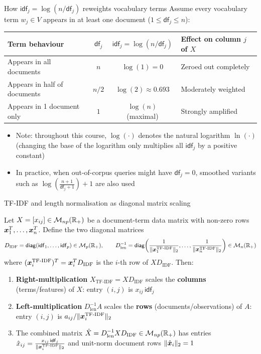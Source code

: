 \documentclass[aspectratio=169]{beamer}\usepackage[]{graphicx}\usepackage[]{xcolor}
\begin{document}
\begin{frame}{How $\mathsf{idf}_j = \log(n / \mathsf{df}_j)$ reweights vocabulary terms}
Assume every vocabulary term $w_j \in V$ appears in at least one document ($1 \le \mathsf{df}_j \le n$):
\vfill
\begin{center}
\begin{tabular}{lccl}
\toprule
\textbf{Term behaviour} & $\mathsf{df}_j$ & $\mathsf{idf}_j = \log(n/\mathsf{df}_j)$ & \textbf{Effect on column $j$ of $X$} \\
\midrule
Appears in all documents & $n$ & $\log(1) = 0$ & Zeroed out completely \\
Appears in half of documents & $n/2$ & $\log(2) \approx 0.693$ & Moderately weighted \\
Appears in 1 document only & $1$ & $\log(n)$ (maximal) & Strongly amplified \\
\bottomrule
\end{tabular}
\end{center}
\vfill
\begin{itemize}
\item Note: throughout this course, $\log(\cdot)$ denotes the natural logarithm $\ln(\cdot)$ (changing the base of the logarithm only multiplies all $\mathsf{idf}_j$ by a positive constant)
\item In practice, when out-of-corpus queries might have $\mathsf{df}_j = 0$, smoothed variants such as $\log\!\left(\frac{n+1}{\mathsf{df}_j+1}\right) + 1$ are also used
\end{itemize}
\end{frame}


\begin{frame}{TF-IDF and length normalisation as diagonal matrix scaling}
\begin{importanttheorem}\label{th:tfidf_diag_scaling}
Let $X = [x_{ij}] \in \mathcal{M}_{np}(\mathbb{R}_+)$ be a document-term data matrix with non-zero rows $\bm{x}_1^T, \ldots, \bm{x}_n^T$. Define the two diagonal matrices
\[
D_{\text{IDF}} = \mathsf{diag}(\mathsf{idf}_1, \ldots, \mathsf{idf}_p) \in \mathcal{M}_p(\mathbb{R}_+), \qquad
D_{\text{len}}^{-1} = \mathsf{diag}\!\left(\frac{1}{\|\bm{x}_1^{\text{TF-IDF}}\|_2}, \ldots, \frac{1}{\|\bm{x}_n^{\text{TF-IDF}}\|_2}\right) \in \mathcal{M}_n(\mathbb{R}_+)
\]
where $(\bm{x}_i^{\text{TF-IDF}})^T = \bm{x}_i^T D_{\text{IDF}}$ is the $i$-th row of $X D_{\text{IDF}}$. Then:
\begin{enumerate}
\item \textbf{Right-multiplication} $X_{\text{TF-IDF}} = X D_{\text{IDF}}$ scales the \textbf{columns} (terms/features) of $X$: entry $(i,j)$ is $x_{ij} \, \mathsf{idf}_j$
\item \textbf{Left-multiplication} $D_{\text{len}}^{-1} A$ scales the \textbf{rows} (documents/observations) of $A$: entry $(i,j)$ is $a_{ij} / \|\bm{x}_i^{\text{TF-IDF}}\|_2$
\item The combined matrix $\hat{X} = D_{\text{len}}^{-1} X D_{\text{IDF}} \in \mathcal{M}_{np}(\mathbb{R}_+)$ has entries $\hat{x}_{ij} = \frac{x_{ij} \, \mathsf{idf}_j}{\|\bm{x}_i^{\text{TF-IDF}}\|_2}$ and unit-norm document rows $\|\hat{\bm{x}}_i\|_2 = 1$
\end{enumerate}
\end{importanttheorem}
\end{frame}
\end{document}

